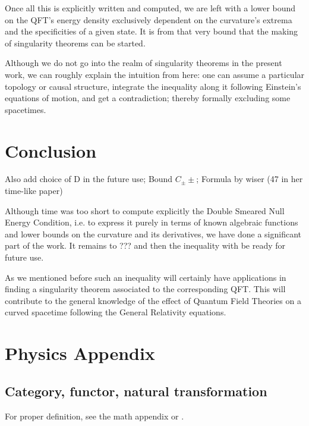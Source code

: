 \documentclass[a4paper,11pt]{article}
\numberwithin{equation}{section}
\theoremstyle{definition}
\begin{document}
Once all this is explicitly written and computed, we are left with a lower bound on the QFT's energy density exclusively dependent on the curvature's extrema and the specificities of a given state. It is from that very bound that the making of singularity theorems can be started.

Although we do not go into the realm of singularity theorems in the present work, we can roughly explain the intuition from here: one can assume a particular topology or causal structure, integrate the inequality along it following Einstein's equations of motion, and get a contradiction; thereby formally excluding some spacetimes.

\section{Conclusion}
\color{red}
Also add choice of D in the future use;
Bound $C_\pm\pm$;
Formula by wiser (47 in her time-like paper)\color{black}

Although time was too short to compute explicitly the Double Smeared Null Energy Condition, i.e. to express it purely in terms of known algebraic functions and lower bounds on the curvature and its derivatives, we have done a significant part of the work. It remains to \color{red} ??? \color{black} and then the inequality with be ready for future use.

As we mentioned before such an inequality will certainly have applications in finding a singularity theorem associated to the corresponding QFT. This will contribute to the general knowledge of the effect of Quantum Field Theories on a curved spacetime following the General Relativity equations.
\newpage
\appendix
\section{Physics Appendix}
    \subsection{Category, functor, natural transformation} \label{AnPhCat}
    For proper definition, see the math appendix or \cite{AlgLang}.
\end{document}
